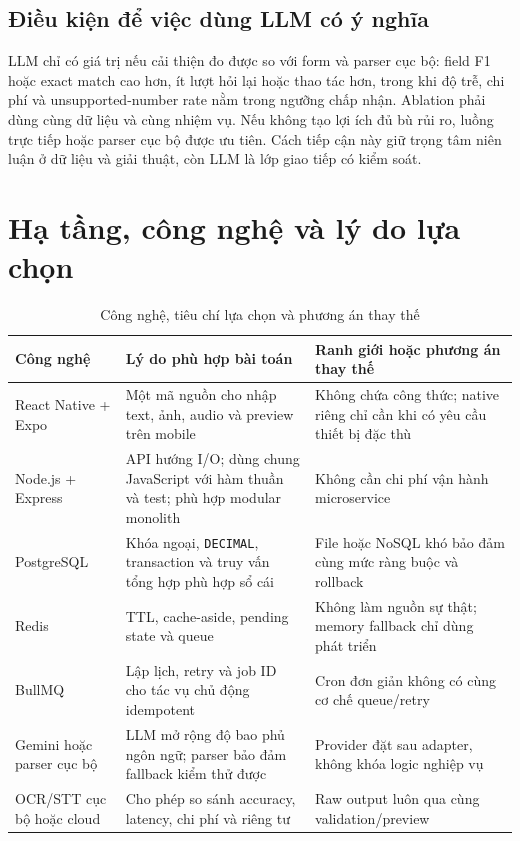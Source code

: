\subsection{Điều kiện để việc dùng LLM có ý nghĩa}

LLM chỉ có giá trị nếu cải thiện đo được so với form và parser cục bộ:
field F1 hoặc exact match cao hơn, ít lượt hỏi lại hoặc thao tác hơn,
trong khi độ trễ, chi phí và unsupported-number rate nằm trong ngưỡng
chấp nhận. Ablation phải dùng cùng dữ liệu và cùng nhiệm vụ. Nếu không
tạo lợi ích đủ bù rủi ro, luồng trực tiếp hoặc parser cục bộ được ưu
tiên. Cách tiếp cận này giữ trọng tâm niên luận ở dữ liệu và giải thuật,
còn LLM là lớp giao tiếp có kiểm soát.

\section{Hạ tầng, công nghệ và lý do lựa chọn}

\begin{table}[htbp]
  \centering
  \caption{Công nghệ, tiêu chí lựa chọn và phương án thay thế}
  \label{tab:technology-rationale}
  \small
  \begin{tabularx}{\textwidth}{|p{3.2cm}|X|X|}
    \hline
    \textbf{Công nghệ} & \textbf{Lý do phù hợp bài toán} &
    \textbf{Ranh giới hoặc phương án thay thế} \\ \hline
    React Native + Expo & Một mã nguồn cho nhập text, ảnh, audio và
    preview trên mobile & Không chứa công thức; native riêng chỉ cần
    khi có yêu cầu thiết bị đặc thù \\ \hline
    Node.js + Express & API hướng I/O; dùng chung JavaScript với hàm
    thuần và test; phù hợp modular monolith & Không cần chi phí vận hành
    microservice \\ \hline
    PostgreSQL & Khóa ngoại, \texttt{DECIMAL}, transaction và truy vấn
    tổng hợp phù hợp sổ cái & File hoặc NoSQL khó bảo đảm cùng mức ràng
    buộc và rollback \\ \hline
    Redis & TTL, cache-aside, pending state và queue & Không làm nguồn
    sự thật; memory fallback chỉ dùng phát triển \\ \hline
    BullMQ & Lập lịch, retry và job ID cho tác vụ chủ động idempotent &
    Cron đơn giản không có cùng cơ chế queue/retry \\ \hline
    Gemini hoặc parser cục bộ & LLM mở rộng độ bao phủ ngôn ngữ; parser
    bảo đảm fallback kiểm thử được & Provider đặt sau adapter, không
    khóa logic nghiệp vụ \\ \hline
    OCR/STT cục bộ hoặc cloud & Cho phép so sánh accuracy, latency, chi
    phí và riêng tư & Raw output luôn qua cùng validation/preview \\
    \hline
  \end{tabularx}
\end{table}

